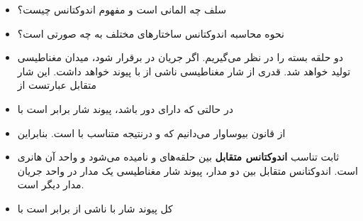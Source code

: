\ELhold


\begin{ELunit}


\begin{itemize}
\tightlist
\item
  سلف چه المانی است و مفهوم اندوکتانس چیست؟
\item
  نحوه محاسبه اندوکتانس ساختارهای مختلف به چه صورتی است؟
\end{itemize}


\begin{itemize}
\tightlist
\item
  دو حلقه بسته را در نظر می‌گیریم. اگر جریان  در  برقرار شود، میدان مغناطیسی  تولید خواهد شد. قدری از شار مغناطیسی ناشی از  با  پیوند خواهد داشت. این شار متقابل عبارتست از
\end{itemize}


\begin{itemize}
\tightlist
\item
  در حالتی که  دارای  دور باشد، پیوند شار برابر است با
\end{itemize}


\begin{itemize}
\tightlist
\item
  از قانون بیوساوار می‌دانیم که  و درنتیجه  متناسب با  است. بنابراین
\end{itemize}


\begin{itemize}
\tightlist
\item
  ثابت تناسب  \textbf{اندوکتانس متقابل} بین حلقه‌های  و  نامیده می‌شود و واحد آن هانری  است. اندوکتانس متقابل بین دو مدار، پیوند شار مغناطیسی یک مدار در واحد جریان مدار دیگر است.
\item
  کل پیوند شار با  ناشی از  برابر است با
\end{itemize}


\end{ELunit}
